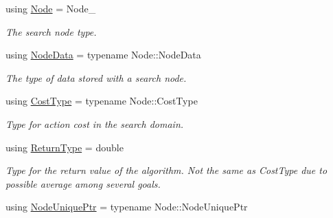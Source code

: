 \begin{DoxyCompactItemize}
\item 
using \hyperlink{structalgorithm_1_1BaseTraits_a95cf86d8632b01d605a17c5044d06873}{Node} = Node\+\_\+\hypertarget{structalgorithm_1_1BaseTraits_a95cf86d8632b01d605a17c5044d06873}{}\label{structalgorithm_1_1BaseTraits_a95cf86d8632b01d605a17c5044d06873}

\begin{DoxyCompactList}\small\item\em The search node type. \end{DoxyCompactList}\item 
using \hyperlink{structalgorithm_1_1BaseTraits_a05b654af4d6bd35af9e72d36a12d904f}{Node\+Data} = typename Node\+::\+Node\+Data\hypertarget{structalgorithm_1_1BaseTraits_a05b654af4d6bd35af9e72d36a12d904f}{}\label{structalgorithm_1_1BaseTraits_a05b654af4d6bd35af9e72d36a12d904f}

\begin{DoxyCompactList}\small\item\em The type of data stored with a search node. \end{DoxyCompactList}\item 
using \hyperlink{structalgorithm_1_1BaseTraits_ac8df9cb2ac3a5f35e201bf1a26dceed9}{Cost\+Type} = typename Node\+::\+Cost\+Type\hypertarget{structalgorithm_1_1BaseTraits_ac8df9cb2ac3a5f35e201bf1a26dceed9}{}\label{structalgorithm_1_1BaseTraits_ac8df9cb2ac3a5f35e201bf1a26dceed9}

\begin{DoxyCompactList}\small\item\em Type for action cost in the search domain. \end{DoxyCompactList}\item 
using \hyperlink{structalgorithm_1_1BaseTraits_a4bfbea73f1059634690455ff7128843d}{Return\+Type} = double\hypertarget{structalgorithm_1_1BaseTraits_a4bfbea73f1059634690455ff7128843d}{}\label{structalgorithm_1_1BaseTraits_a4bfbea73f1059634690455ff7128843d}

\begin{DoxyCompactList}\small\item\em Type for the return value of the algorithm. Not the same as Cost\+Type due to possible average among several goals. \end{DoxyCompactList}\item 
using \hyperlink{structalgorithm_1_1BaseTraits_afad7192f72922bcd6289a2c8c43a0cbc}{Node\+Unique\+Ptr} = typename Node\+::\+Node\+Unique\+Ptr\hypertarget{structalgorithm_1_1BaseTraits_afad7192f72922bcd6289a2c8c43a0cbc}{}\label{structalgorithm_1_1BaseTraits_afad7192f72922bcd6289a2c8c43a0cbc}


\end{DoxyCompactItemize}

